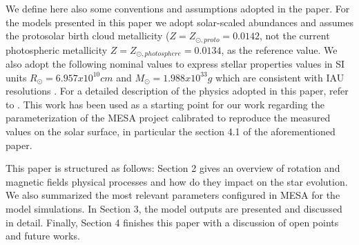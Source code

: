 \documentclass[fleqn,usenatbib]{mnras}
\begin{document}
We define here also some conventions and assumptions adopted in the paper. For the models presented in this paper we adopt solar-scaled abundances and assumes the \citet{Asplund2009} protosolar birth cloud metallicity ($Z = Z_{\odot, proto} = 0.0142$, not the current photospheric metallicity $Z = Z_{\odot, photosphere} = 0.0134$, as the reference value. We also adopt the following nominal values to express stellar properties values in SI units $R_{\odot} = 6.957x10^{10} cm$ and $M_{\odot} = 1.988x10^{33} g$ which are consistent with IAU resolutions \citep{Mamajek2015} . For a detailed description of the physics adopted in this paper, refer to \citet{Choi2016}. This work has been used as a starting point for our work regarding the parameterization of the MESA project calibrated to reproduce the measured values on the solar surface, in particular the section 4.1 of the aforementioned paper.\par

This paper is structured as follows: Section 2 gives an overview of rotation and magnetic fields physical processes and how do they impact on the star evolution. We also summarized the most relevant parameters configured in MESA for the model simulations. In Section 3, the model outputs are presented and discussed in detail. Finally, Section 4 finishes this paper with a discussion of open points and future works.\par
\end{document}
